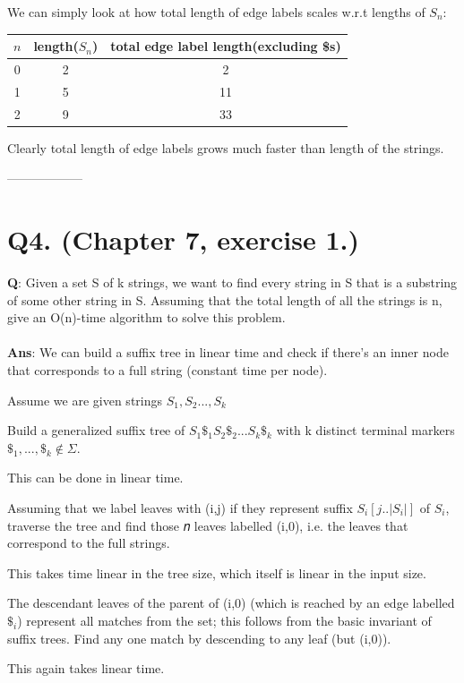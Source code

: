 \documentclass[a4paper,11pt]{article}
\begin{document}
We can simply look at how total length of edge labels scales w.r.t lengths of $S_n$:
\begin{center}
\begin{tabular}{ | c | c | c | }
\hline
$n$ & length($S_n$) & total edge label length(excluding \$s) \\ 
\hline
\hline
 0 & 2 & 2\\
 \hline
 1 & 5 & 11 \\  
 \hline
 2 & 9 & 33 \\   
\hline
 \end{tabular}
\end{center}
Clearly total length of edge labels grows much faster than length of the strings.
\begin{center}
 ------------------
\end{center}
\section*{Q4. (Chapter 7, exercise 1.)}
\textbf{Q}: Given a set S of k strings, we want to find every string in S that is a substring of some other string in S. Assuming that the total length of all the strings is n, give an O(n)-time algorithm to solve this problem. 
\\
\\
\textbf{Ans}: We can build a suffix tree in linear time and check if there's an inner node that corresponds to a full string (constant time per node).

Assume we are given strings $S_1,S_2...,S_k$

Build a generalized suffix tree of $S_1\$_1S_2\$_2...S_k\$_k$ with k distinct terminal markers $\$_1,...,\$_k \notin \Sigma$.   

This can be done in linear time.

Assuming that we label leaves with (i,j) if they represent suffix $S_i[j..|S_i|]$ of $S_i$, traverse the tree and find those 𝑛 leaves labelled (i,0), i.e. the leaves that correspond to the full strings.

This takes time linear in the tree size, which itself is linear in the input size.

The descendant leaves of the parent of (i,0) (which is reached by an edge labelled $\$_i$) represent all matches from the set; this follows from the basic invariant of suffix trees. Find any one match by descending to any leaf (but (i,0)).

This again takes linear time.
\end{document}
